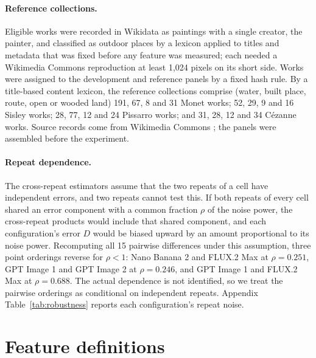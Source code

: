 \paragraph{Reference collections.}
Eligible works were recorded in Wikidata as paintings with a single creator, the painter, and
classified as outdoor places by a lexicon applied to titles and metadata that was fixed before
any feature was measured; each needed a Wikimedia Commons reproduction at least 1,024 pixels on
its short side. Works were assigned to the development and reference panels by a fixed hash
rule. By a title-based content lexicon, the reference collections comprise (water, built place,
route, open or wooded land) 191, 67, 8 and 31 Monet works; 52, 29, 9 and 16 Sisley works; 28,
77, 12 and 24 Pissarro works; and 31, 28, 12 and 34 C\'ezanne works. Source records come from Wikimedia
Commons \citep{wikimediacommons}; the panels were assembled before the experiment.

\paragraph{Repeat dependence.}
The cross-repeat estimators assume that the two repeats of a cell have independent errors, and
two repeats cannot test this. If both repeats of every cell shared an error component with a
common fraction $\rho$ of the noise power, the cross-repeat products would include that shared
component, and each configuration's error $D$ would be biased upward by an amount proportional
to its noise power. Recomputing all 15 pairwise differences under this assumption, three point
orderings reverse for $\rho<1$: Nano Banana 2 and FLUX.2 Max at $\rho=0.251$, GPT Image 1 and
GPT Image 2 at $\rho=0.246$, and GPT Image 1 and FLUX.2 Max at $\rho=0.688$. The actual
dependence is not identified, so we treat the pairwise orderings as conditional on independent
repeats. Appendix Table~\ref{tab:robustness} reports each configuration's repeat noise.

\FloatBarrier
\section{Feature definitions}\label{app:features}

